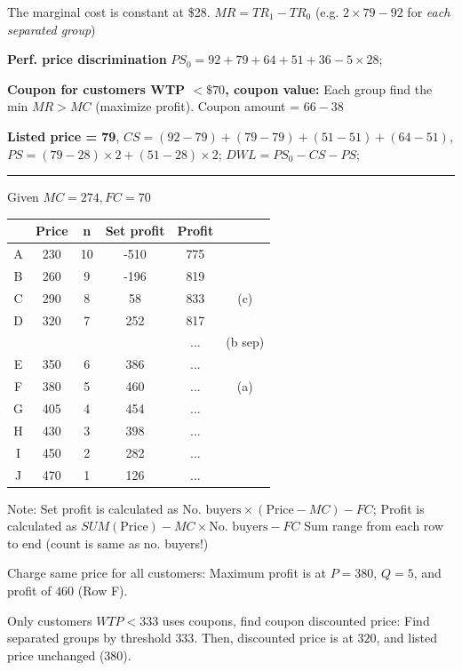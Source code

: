 \documentclass[a4paper]{article}
\begin{document}
\begin{multicols*}{3}
    The marginal cost is constant at \$28. $MR=TR_1-TR_0$ (e.g. $2\times79-92$ for \textit{each separated group})

    \textbf{Perf. price discrimination} $PS_0 = 92+79+64+51+36-5\times28$;

    \textbf{Coupon for customers WTP $<\$70$, coupon value:} Each group find the min $MR>MC$ (maximize profit). Coupon amount = $66-38$

    \textbf{Listed price = 79}, $CS = (92-79) + (79-79) + (51-51) + (64-51)$, $PS = (79-28)\times2+(51-28)\times2$; $DWL = PS_0 - CS - PS$;

    \rule{1\linewidth}{0.4pt}

    Given $MC=274, FC=70$

    \begin{tabular}{|c|c|c|c|c|c|}
        \hline
          & Price & n  & Set profit & Profit &         \\
        \hline
        A & 230   & 10 & -510       & 775    &         \\
        B & 260   & 9  & -196       & 819    &         \\
        C & 290   & 8  & 58         & 833    & (c)     \\
        D & 320   & 7  & 252        & 817    &         \\
          &       &    &            & ...    & (b sep) \\
        E & 350   & 6  & 386        & ...    &         \\
        F & 380   & 5  & 460        & ...    & (a)     \\
        G & 405   & 4  & 454        & ...    &         \\
        H & 430   & 3  & 398        & ...    &         \\
        I & 450   & 2  & 282        & ...    &         \\
        J & 470   & 1  & 126        & ...    &         \\
        \hline
    \end{tabular}

    Note: Set profit is calculated as $\text{No. buyers}\times(\text{Price} - MC) - FC$; Profit is calculated as $SUM(\text{Price}) - MC \times \text{No. buyers} - FC$ Sum range from each row to end (count is same as no. buyers!)

    Charge same price for all customers: Maximum profit is at $P=380$, $Q=5$, and profit of $460$ (Row F).

    Only customers $WTP<333$ uses coupons, find coupon discounted price: Find separated groups by threshold $333$. Then, discounted price is at $320$, and listed price unchanged ($380$).


\end{multicols*}
\end{document}
